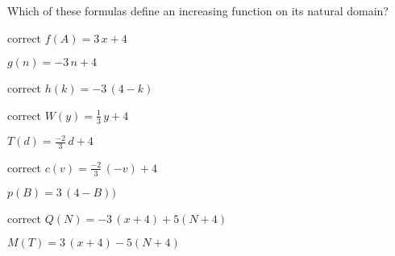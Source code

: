 \documentclass{ximera}
\author{Lee Wayand}
\begin{document}
\begin{exercise}



\begin{question}

Which of these formulas define an increasing function on its natural domain? \\



\begin{selectAll}
\item [correct]{$f(A) = 3 \, x + 4$}
\item {$g(n) = -3 \, n + 4$}
\item [correct]{$h(k) = -3 \, (4 - k)$}
\item [correct]{$W(y) = \frac{1}{3} \, y + 4$}
\item {$T(d) = \frac{-2}{3} \, d + 4$}
\item [correct]{$c(v) = \frac{-2}{3} \, (-v) + 4$}
\item {$p(B) = 3 \, (4 - B))$}
\item [correct]{$Q(N) = -3 \, (x + 4) + 5(N + 4)$}
\item {$M(T) = 3 \, (x + 4) - 5(N + 4)$}
\end{selectAll}




\end{question}











\end{exercise}
\end{document}
